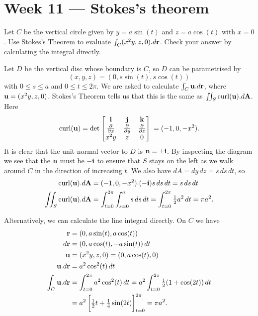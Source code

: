 \documentclass[a4paper]{amsart}
\renewenvironment{solution}{\SolutionInline}{\endSolutionInline}
\begin{document}
\section*{Week 11 --- Stokes's theorem}

\begin{exercise}
 Let $C$ be the vertical circle given by $y=a\sin(t)$ and $z=a\cos(t)$
 with $x=0$.  Use Stokes's Theorem to evaluate
 $\int_C(x^2y,z,0).d\mathbf{r}$.  Check your answer by calculating the
 integral directly.
\end{exercise}
\begin{solution}
 Let $D$ be the vertical disc whose boundary is $C$, so $D$ can be
 parametrised by 
 \[ (x,y,z) = (0,s\sin(t),s\cos(t)) \]
 with $0\leq s\leq a$ and $0\leq t\leq 2\pi$.  We are asked to
 calculate $\int_C\mathbf{u}.d\mathbf{r}$, where $\mathbf{u}=(x^2y,z,0)$.  Stokes's Theorem
 tells us that this is the same as $\iint_S\operatorname{curl}(\mathbf{u}).d\mathbf{A}$.  Here 
 \[ \operatorname{curl}(\mathbf{u})
    = \det\left[\begin{matrix} \mathbf{i}  & \mathbf{j}  & \mathbf{k}  \\
               \frac{\partial}{\partial x} & \frac{\partial}{\partial y} & \frac{\partial}{\partial z} \\
               x^2y & z    & 0 \end{matrix}\right]  \\
    = (-1,0,-x^2).
 \]
 It is clear that the unit normal vector to $D$ is $\mathbf{n}=\pm\mathbf{i}$.  By
 inspecting the diagram we see that the $\mathbf{n}$ must be $-\mathbf{i}$ to ensure
 that $S$ stays on the left as we walk around $C$ in the direction of
 increasing $t$.  We also have $dA=dy\,dz=s\,ds\,dt$, so 
 \begin{align*}
  \operatorname{curl}(\mathbf{u}).d\mathbf{A} &= (-1,0,-x^2).(-\mathbf{i})s\,ds\,dt = s\,ds\,dt \\
  \iint_S\operatorname{curl}(\mathbf{u}).d\mathbf{A}
   &= \int_{t=0}^{2\pi}\int_{s=0}^a s\,ds\,dt 
    = \int_{t=0}^{2\pi} \tfrac{1}{2} a^2 \,dt = \pi a^2.
 \end{align*}

 Alternatively, we can calculate the line integral directly.  On $C$
 we have 
 \begin{align*}
  \vr &= (0,a\sin(t),a\cos(t)) \\
  d\vr &= (0,a\cos(t),-a\sin(t))\,dt \\
  \vu &= (x^2y,z,0) = (0,a\cos(t),0) \\
  \vu.d\vr &= a^2\cos^2(t)\,dt \\
  \int_C\vu.d\vr &= \int_{t=0}^{2\pi}a^2\cos^2(t)\,dt 
   = a^2 \int_{t=0}^{2\pi} \half(1+\cos(2t))\,dt \\
   &= a^2 \CH{\half t + \tfrac{1}{4}\sin(2t)}_{t=0}^{2\pi} = \pi a^2.
 \end{align*}
\end{solution}
\end{document}

